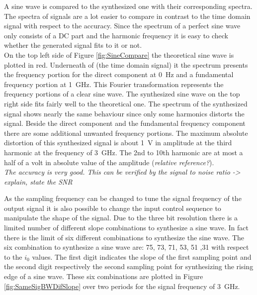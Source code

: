 A sine wave is compared to the synthesized one with their corresponding spectra.
The spectra of signals are a lot easier to compare in contrast to the time domain signal with respect to the accuracy.
Since the spectrum of a perfect sine wave only consists of a DC part and the harmonic frequency it is easy to check whether the generated signal fits to it or not.\\
On the top left side of Figure \ref{fig:SineCompare} the theoretical sine wave is plotted in red. Underneath of (the time domain signal) it the spectrum presents the frequency portion for the direct component at \SI{0} {\Hz} and a fundamental frequency portion at \SI{1}{\GHz}.
This Fourier transformation represents the frequency portions of a clear sine wave. 
The synthesized sine wave on the top right side fits fairly well to the theoretical one.
The spectrum of the synthesized signal shows nearly the same behaviour since only some harmonics distorts the signal.
Beside the direct component and the fundamental frequency component there are some additional unwanted frequency portions.
The maximum absolute distortion of this synthesized signal is about \SI{1}{\volt} in amplitude at the third harmonic at the frequency of \SI{3}{\GHz}.
 The 2nd to 10th harmonic are at most a half of a volt in absolute value of the amplitude (\textit{relative reference?}). \\
\textit{The accuracy is very good. This can be verified by the signal to noise ratio -> explain, state the SNR}


As the sampling frequency can be changed to tune the signal frequency of the output signal it is also possible to change the input control sequence to manipulate the shape of the signal.
Due to the three bit resolution there is a limited number of different slope combinations to synthesize a sine wave.
In fact there is the limit of six different combinations to synthesize the sine wave.
The six combination to synthesize a sine wave are: 75, 73, 71, 53, 51 ,31 with respect to the $i_0$ values.
The first digit indicates the slope of the first sampling point and the second digit respectively the second sampling point for synthesizing the rising edge of a sine wave.
These six combinations are plotted in Figure \ref{fig:SameSigBWDifSlope} over two periods for the signal frequency of \SI{3}{\GHz}. 

